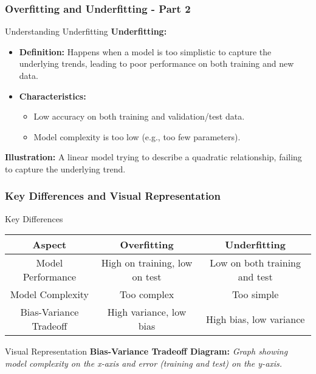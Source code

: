 \documentclass[aspectratio=169]{beamer}
\begin{document}
\begin{frame}[fragile]
    \frametitle{Overfitting and Underfitting - Part 2}
    
    \begin{block}{Understanding Underfitting}
        \textbf{Underfitting:}
        \begin{itemize}
            \item \textbf{Definition:} Happens when a model is too simplistic to capture the underlying trends, leading to poor performance on both training and new data.
            \item \textbf{Characteristics:}
            \begin{itemize}
                \item Low accuracy on both training and validation/test data.
                \item Model complexity is too low (e.g., too few parameters).
            \end{itemize}
        \end{itemize}
        
        \textbf{Illustration:} 
        A linear model trying to describe a quadratic relationship, failing to capture the underlying trend.
    \end{block}
\end{frame}

\begin{frame}[fragile]
    \frametitle{Key Differences and Visual Representation}
    
    \begin{block}{Key Differences}
        \begin{tabular}{|c|c|c|}
            \hline
            \textbf{Aspect} & \textbf{Overfitting} & \textbf{Underfitting} \\
            \hline
            Model Performance & High on training, low on test & Low on both training and test \\
            \hline
            Model Complexity & Too complex & Too simple \\
            \hline
            Bias-Variance Tradeoff & High variance, low bias & High bias, low variance \\
            \hline
        \end{tabular}
    \end{block}

    \begin{block}{Visual Representation}
        \textbf{Bias-Variance Tradeoff Diagram:}
        \textit{Graph showing model complexity on the x-axis and error (training and test) on the y-axis.}
    \end{block}
\end{frame}
\end{document}
